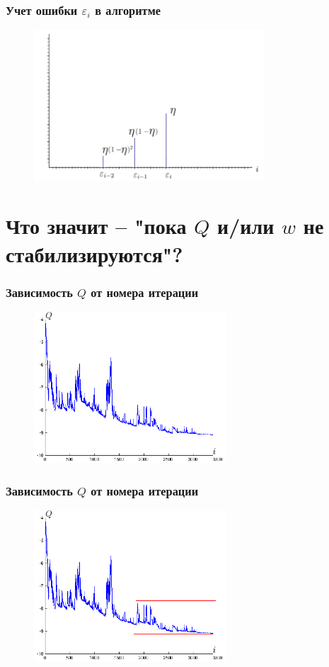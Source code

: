 \documentclass[10pt]{beamer}
\begin{document}
\begin{frame}\frametitle{Учет ошибки $\varepsilon_i$ в алгоритме}
	\begin{figure}[htbp]
	  \includegraphics[height=160pt, keepaspectratio = true]{images/l2}
	\end{figure}
\end{frame}

\section{Что значит -- "пока $Q$ и/или $w$ не стабилизируются"?}

\begin{frame}\frametitle{Зависимость $Q$ от номера итерации}
	\begin{figure}[htbp]
	  \includegraphics[height=160pt, keepaspectratio = true]{images/stochastic_gradient}
	\end{figure}
\end{frame}

\begin{frame}\frametitle{Зависимость $Q$ от номера итерации}
	\begin{figure}[htbp]
	  \includegraphics[height=160pt, keepaspectratio = true]{images/stochastic_gradient1}
	\end{figure}
\end{frame}
\end{document}
